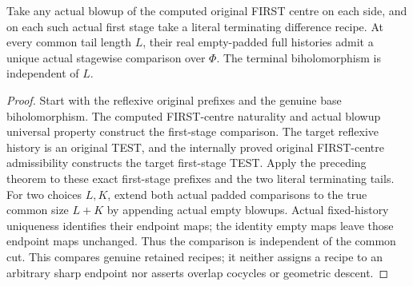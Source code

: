\begin{theorem}
\label{hir:sharp-actual-curve-biholo-two-phase-padded-recipes}
\leanok
Take any actual blowup of the computed original FIRST centre on each side,
and on each such actual first stage take a literal terminating difference
recipe. At every common tail length $L$, their real empty-padded full
histories admit a unique actual stagewise comparison over $\Phi$.
The terminal biholomorphism is independent of $L$.
\end{theorem}
\begin{proof}
Start with the reflexive original prefixes and the genuine base
biholomorphism. The computed FIRST-centre naturality and actual blowup
universal property construct the first-stage comparison. The target
reflexive history is an original TEST, and the internally proved original
FIRST-centre admissibility constructs the target first-stage TEST.
Apply the preceding theorem to these exact first-stage prefixes and the
two literal terminating tails. For two choices $L,K$, extend both actual
padded comparisons to the true common size $L+K$ by appending actual empty
blowups. Actual fixed-history uniqueness identifies their endpoint maps;
the identity empty maps leave those endpoint maps unchanged. Thus the
comparison is independent of the common cut. This compares genuine retained
recipes; it neither assigns a recipe to an arbitrary sharp endpoint nor
asserts overlap cocycles or geometric descent.
\end{proof}
